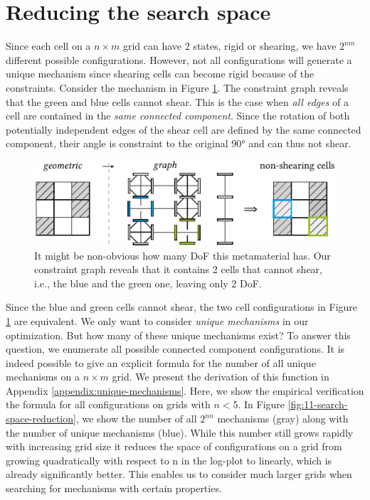 \section{Reducing the search space}
\label{section:search-space}

Since each cell on a $n\times m$ grid can have 2 states, rigid or shearing, we have $2^{nm}$ different possible configurations. However, not all configurations will generate a unique mechanism since shearing cells can become rigid because of the constraints. Consider the mechanism in Figure \ref{fig:10-non-shearing-constraint-graph}. The constraint graph reveals that the green and blue cells cannot shear. This is the case when \textit{all edges} of a cell are contained in the \textit{same connected component}. Since the rotation of both potentially independent edges of the shear cell are defined by the same connected component, their angle is constraint to the original 90° and can thus not shear.

\begin{figure} [h]
    \includegraphics[width=\textwidth]{chapters/understanding-metamaterial-mechanisms-FIG/10-non-shearing-constraint-graph.pdf}
    \caption[Short figure name.]{It might be non-obvious how many DoF this metamaterial has. Our constraint graph reveals that it contains 2 cells that cannot shear, i.e., the blue and the green one, leaving only 2 DoF.
    \label{fig:10-non-shearing-constraint-graph}}
\end{figure}

Since the blue and green cells cannot shear, the two cell configurations in Figure \ref{fig:10-non-shearing-constraint-graph} are equivalent. We only want to consider \textit{unique mechanisms} in our optimization. But how many of these unique mechanisms exist? To answer this question, we enumerate all possible connected component configurations. It is indeed possible to give an explicit formula for the number of all unique mechanisms on a $n \times m$ grid. 
We present the derivation of this function in Appendix \ref{appendix:unique-mechanisms}. Here, we show the empirical verification the formula for all configurations on grids with $n<5$. 
In Figure \ref{fig:11-search-space-reduction}, we show the number of all $2^{nn}$ mechanisms (gray) along with the number of unique mechanisms (blue). While this number still grows rapidly with increasing grid size it reduces the space of configurations on a grid from growing quadratically with respect to n in the log-plot to linearly, which is already significantly better. This enables us to consider much larger grids when searching for mechanisms with certain properties. 

